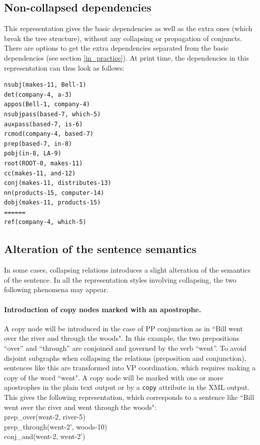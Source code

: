 \documentclass[11pt,letter]{article}
\begin{document}
\subsection{Non-collapsed dependencies}\label{non-collapsed}
This representation gives the basic dependencies as well as the extra ones (which break the tree structure), without any collapsing or propagation of conjuncts. There are options to get the extra dependencies separated from the basic dependencies (see section \ref{in_practice}). At print time, the dependencies in this representation can thus look as follows:
\begin{verbatim}
nsubj(makes-11, Bell-1)
det(company-4, a-3)
appos(Bell-1, company-4)
nsubjpass(based-7, which-5)
auxpass(based-7, is-6)
rcmod(company-4, based-7)
prep(based-7, in-8)
pobj(in-8, LA-9)
root(ROOT-0, makes-11)
cc(makes-11, and-12)
conj(makes-11, distributes-13)
nn(products-15, computer-14)
dobj(makes-11, products-15)
======
ref(company-4, which-5)
\end{verbatim}


\subsection{Alteration of the sentence semantics}\label{alteration}
In some cases, collapsing relations introduces a slight alteration of the semantics of the sentence. In all the representation styles involving collapsing, the two following phenomena may appear.

\paragraph{Introduction of copy nodes marked with an apostrophe.}
A copy node will be introduced in the case of PP conjunction as in ``Bill went over the river and through the woods". In this example, the two prepositions ``over'' and ``through'' are conjoined and governed by the verb ``went''. To avoid disjoint subgraphs when collapsing the relations (preposition and conjunction), sentences like this are transformed into VP coordination, which requires making a copy of the word ``went". A copy node will be marked with one or more apostrophes in the plain text output or by a \texttt{copy} attribute in the XML output. This gives the following representation, which corresponds to a sentence like ``Bill went over the river and went through the woods":\\
\indent prep\_over(went-2, river-5)\\
\indent prep\_through(went-2’, woods-10)\\
\indent conj\_and(went-2, went-2’)
\end{document}

